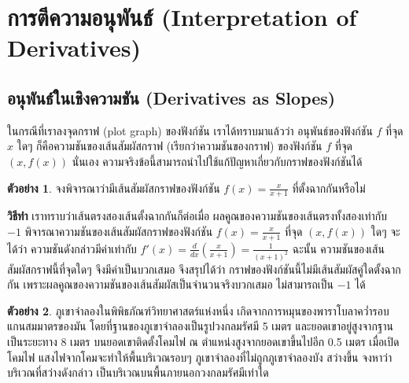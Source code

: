 \documentclass[
]{book}
\theoremstyle{definition}
\theoremstyle{definition}
\newtheorem{example}{ตัวอย่าง}[chapter]
\theoremstyle{definition}
\theoremstyle{definition}
\theoremstyle{remark}
\begin{document}
\section{การตีความอนุพันธ์ (Interpretation of Derivatives)}\label{uxe01uxe32uxe23uxe15uxe04uxe27uxe32uxe21uxe2duxe19uxe1euxe19uxe18-interpretation-of-derivatives}

\subsection{อนุพันธ์ในเชิงความชัน (Derivatives as Slopes)}\label{uxe2duxe19uxe1euxe19uxe18uxe43uxe19uxe40uxe0auxe07uxe04uxe27uxe32uxe21uxe0auxe19-derivatives-as-slopes}

ในกรณีที่เราลงจุดกราฟ (plot graph) ของฟังก์ชัน เราได้ทราบมาแล้วว่า อนุพันธ์ของฟังก์ชัน
\(f\) ที่จุด \(x\) ใดๆ ก็คือความชันของเส้นสัมผัสกราฟ (เรียกว่าความชันของกราฟ) ของฟังก์ชัน
\(f\) ที่จุด \((x,f(x))\) นั่นเอง
ความจริงข้อนี้สามารถนำไปใช้แก้ปัญหาเกี่ยวกับกราฟของฟังก์ชันได้

\begin{example}
จงพิจารณาว่ามีเส้นสัมผัสกราฟของฟังก์ชัน \(\displaystyle f(x)=\frac{x}{x+1}\)
ที่ตั้งฉากกันหรือไม่
\end{example}

\textbf{วิธีทำ} เราทราบว่าเส้นตรงสองเส้นตั้งฉากกันก็ต่อเมื่อ
ผลคูณของความชันของเส้นตรงทั้งสองเท่ากับ \(-1\) พิจารณาความชันของเส้นสัมผัสกราฟของฟังก์ชัน
\(\displaystyle f(x)=\frac{x}{x+1}\) ที่จุด \((x,f(x))\) ใดๆ จะได้ว่า
ความชันดังกล่าวมีค่าเท่ากับ
\(\displaystyle f'(x)=\frac{d}{dx}\left(\frac{x}{x+1}\right)=\frac{1}{(x+1)^2}\)
ฉะนั้น ความชันของเส้นสัมผัสกราฟนี้ที่จุดใดๆ จึงมีค่าเป็นบวกเสมอ จึงสรุปได้ว่า
กราฟของฟังก์ชันนี้ไม่มีเส้นสัมผัสคู่ใดตั้งฉากกัน
เพราะผลคูณของความชันของเส้นสัมผัสเป็นจำนวนจริงบวกเสมอ ไม่สามารถเป็น \(-1\) ได้

\begin{example}
\label{exa-mountain}{} ภูเขาจำลองในพิพิธภัณฑ์วิทยาศาสตร์แห่งหนึ่ง
เกิดจากการหมุนของพาราโบลาคว่ำรอบแกนสมมาตรของมัน
โดยที่ฐานของภูเขาจำลองเป็นรูปวงกลมรัศมี 5 เมตร และยอดเขาอยู่สูงจากฐานเป็นระยะทาง 8
เมตร บนยอดเขาติดตั้งโคมไฟ ณ ตำแหน่งสูงจากยอดเขาขึ้นไปอีก 0.5 เมตร เมื่อเปิดโคมไฟ
แสงไฟจากโคมจะทำให้พื้นบริเวณรอบๆ ภูเขาจำลองที่ไม่ถูกภูเขาจำลองบัง สว่างขึ้น
จงหาว่าบริเวณที่สว่างดังกล่าว เป็นบริเวณบนพื้นภายนอกวงกลมรัศมีเท่าใด
\end{example}
\end{document}
